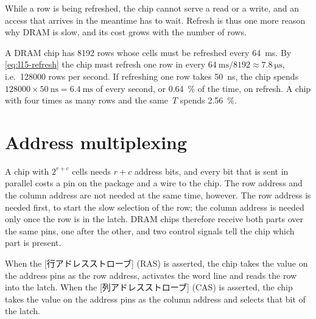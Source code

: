 \documentclass[../main.tex]{subfiles}
\begin{document}
While a row is being refreshed, the chip cannot serve a read or a write, and an
access that arrives in the meantime has to wait.  Refresh is thus one more
reason why DRAM is slow, and its cost grows with the number of rows.

\begin{example}
  \label{ex:l15-refresh}
  A DRAM chip has \num{8192} rows whose cells must be refreshed every
  \SI{64}{\milli\second}.  By \cref{eq:l15-refresh} the chip must refresh one
  row in every $\SI{64}{\milli\second}/\num{8192} \approx
  \SI{7.8}{\micro\second}$, i.e.\ \num{128000} rows per second.  If
  refreshing one row takes \SI{50}{\nano\second}, the chip spends
  $\num{128000} \times \SI{50}{\nano\second} = \SI{6.4}{\milli\second}$ of
  every second, or \SI{0.64}{\percent} of the time, on refresh.  A chip with
  four times as many rows and the same~$T$ spends \SI{2.56}{\percent}.
\end{example}

\section{Address multiplexing}
\label{sec:l15-ras-cas}

A chip with $2^{r+c}$ cells needs $r+c$ address bits, and every bit that is
sent in parallel costs a pin on the package and a wire to the
chip.  The row address and the column
address are not needed at the same time, however.  The row address is needed
first, to start the slow selection of the row; the column address is needed
only once the row is in the latch.  DRAM chips therefore receive both parts
over the same pins, one after the other, and two control signals tell the chip
which part is present.

\begin{definition}
  When the [行アドレスストローブ] (RAS) is asserted, the chip takes the
  value on the address pins as the row address, activates the word line and
  reads the row into the latch.  When the
  [列アドレスストローブ]%
   (CAS) is asserted, the chip takes the
  value on the address pins as the column address and selects that bit of the
  latch.
\end{definition}
\end{document}
